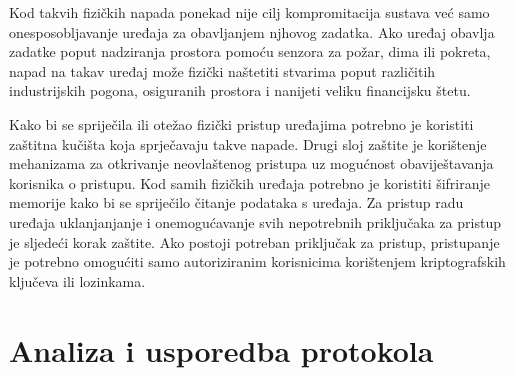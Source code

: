 \documentclass[times, utf8, diplomski]{fer}
\begin{document}
Kod takvih fizičkih napada ponekad nije cilj kompromitacija sustava već samo onesposobljavanje uređaja za obavljanjem njhovog zadatka. Ako uređaj obavlja zadatke poput nadziranja prostora pomoću senzora za požar, dima ili pokreta, napad na takav uređaj može fizički naštetiti stvarima poput različitih industrijskih pogona, osiguranih prostora i nanijeti veliku financijsku štetu.

Kako bi se spriječila ili otežao fizički pristup uređajima potrebno je koristiti zaštitna kučišta koja sprječavaju takve napade. Drugi sloj zaštite je korištenje mehanizama za otkrivanje neovlaštenog pristupa uz mogućnost obaviještavanja korisnika o pristupu. Kod samih fizičkih uređaja potrebno je koristiti šifriranje memorije kako bi se spriječilo čitanje podataka s uređaja. Za pristup radu uređaja uklanjanjanje i onemogućavanje svih nepotrebnih priključaka za pristup je sljedeći korak zaštite. Ako postoji potreban priključak za pristup, pristupanje je potrebno omogućiti samo autoriziranim korisnicima korištenjem kriptografskih ključeva ili lozinkama.


\chapter{Analiza i usporedba protokola}
\end{document}
